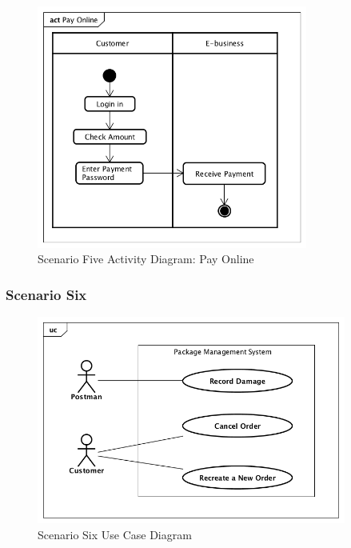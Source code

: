 \documentclass[12pt]{scrreprt}
\begin{document}
\begin{figure}[H]
  \centering\includegraphics[width=3.5in]{DocumentRes/5PayOnline.png}
  \caption{Scenario Five Activity Diagram: Pay Online}
\end{figure}

\subsubsection{Scenario Six}
\begin{figure}[H]
  \centering\includegraphics[width=4in]{DocumentRes/6UseCaseDiagram.png}
  \caption{Scenario Six Use Case Diagram}
\end{figure}
\end{document}
